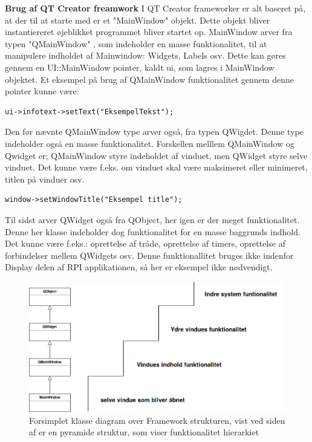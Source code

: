 \documentclass[Softwaredesign/Softwaredesign_main.tex]{subfiles}
\begin{document}
\textbf{Brug af QT Creator freamwork}
I QT Creator frameworker er alt baseret på, at der til at starte med er et "MainWindow" objekt.  Dette objekt bliver instantiereret øjeblikket programmet bliver startet op.  MainWindow arver fra typen "QMainWindow" , som indeholder en masse funktionalitet,  til at manipulere indholdet af Mainwindow: Widgets, Labels osv.  Dette kan gøres gennem en UI::MainWindow pointer, kaldt ui, som lagres i MainWindow objektet. Et eksempel på brug af QMainWindow funktionalitet gennem denne pointer kunne være:
\begin{verbatim}
ui->infotext->setText("EksempelTekst");
\end{verbatim}
Den før nævnte  QMainWindow type arver også, fra typen QWigdet. Denne type indeholder også en masse funktionalitet. Forskellen melllem QMainWindow og Qwidget er; QMainWindow styre indeholdet af vinduet, men QWidget styre selve vinduet. Det kunne være f.eks.  om vinduet skal være maksimeret eller minimeret, titlen på vinduer osv. 
\begin{verbatim}
window->setWindowTitle("Eksempel title");
\end{verbatim}
Til sidst arver QWidget også fra QObject, her igen er der meget funktionalitet. Denne her klasse indeholder dog funktionalitet for en masse baggrunds indhold. Det kunne være f.eks.: oprettelse af tråde, oprettelse af timers, oprettelse af forbindelser mellem QWidgets osv. Denne funktionallitet bruges ikke indenfor Display delen af RPI applikationen, så her er eksempel ikke nødvendigt. 

\begin{figure}[H]
    \centering
    \includegraphics[scale=0.5]{Softwaredesign/GUI/Pictures/Brug_af_Framework.png}
    \caption{Forsimplet klasse diagram over Framework strukturen, vist ved siden af er en pyramide struktur, som viser funktionalitet hierarkiet}
    \label{fig:brug_af_framework}
\end{figure}
\end{document}

